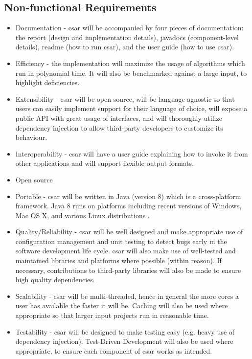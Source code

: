 \documentclass[12pt, letterpaper]{article}
\begin{document}
\subsection{Non-functional Requirements}
\begin{itemize}
  \item Documentation - csar will be accompanied by four pieces of documentation: the report (design and implementation details), javadocs (component-level details), readme (how to run csar), and the user guide (how to use csar).
  \item Efficiency - the implementation will maximize the usage of algorithms which run in polynomial time.
  It will also be benchmarked against a large input, to highlight deficiencies.
  \item Extensibility - csar will be open source, will be language-agnostic so that users can easily implement support for their language of choice, will expose a public API with great usage of interfaces, and will thoroughly utilize dependency injection to allow third-party developers to customize its behaviour.
  \item Interoperability - csar will have a user guide explaining how to invoke it from other applications and will support flexible output formats.
  \item Open source
  \item Portable - csar will be written in Java (version 8) which is a cross-platform framework.
  Java 8 runs on platforms including recent versions of Windows, Mac OS X, and various Linux distributions \autocite{javasysreqs}.
  \item Quality/Reliability - csar will be well designed and make appropriate use of configuration management and unit testing to detect bugs early in the software development life cycle.
  csar will also make use of well-tested and maintained libraries and platforms where possible (within reason).
  If necessary, contributions to third-party libraries will also be made to ensure high quality dependencies.
  \item Scalability - csar will be multi-threaded, hence in general the more cores a user has available the faster it will be.
  Caching will also be used where appropriate so that larger input projects run in reasonable time.
  \item Testability - csar will be designed to make testing easy (e.g. heavy use of dependency injection).
  Test-Driven Development will also be used where appropriate, to ensure each component of csar works as intended.
\end{itemize}
\end{document}
